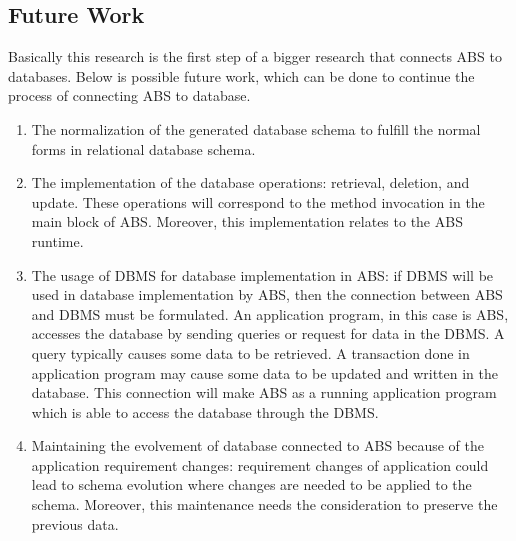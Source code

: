 \documentclass[runningheads,a4paper]{llncs}
\begin{document}
\subsection{Future Work}
Basically this research is the first step of a bigger research that connects ABS to databases. Below is possible future work, which can be done to continue the process of connecting ABS to database.

\begin{enumerate}
	\item The normalization of the generated database schema to fulfill the normal forms in relational database schema.
	\item The implementation of the database operations: retrieval, deletion, and update. These operations will correspond to the method invocation in the main block of ABS. Moreover, this implementation relates to the ABS runtime.
	\item The usage of DBMS for database implementation in ABS: if DBMS will be used in database implementation by ABS, then the connection between ABS and DBMS must be formulated. An application program, in this case is ABS, accesses the database by sending queries or request for data in the DBMS. A query typically causes some data to be retrieved. A transaction done in application program may cause some data to be updated and written in the database. This connection will make ABS as a running application program which is able to access the database through the DBMS.
	\item Maintaining the evolvement of database connected to ABS because of the application requirement changes: requirement changes of application could lead to schema evolution where changes are needed to be applied to the schema. Moreover, this maintenance needs the consideration to preserve the previous data.
\end{enumerate}
\end{document}
